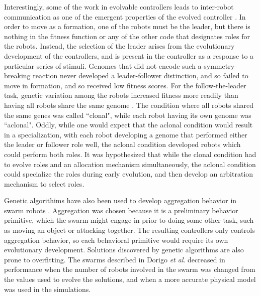 Interestingly, some of the work in evolvable controllers leads to inter-robot communication as one of the emergent properties of the evolved controller \citep{quinn2001evolving}.
In order to move as a formation, one of the robots must be the leader, but there is nothing in the fitness function or any of the other code that designates roles for the robots. 
Instead, the selection of the leader arises from the evolutionary development of the controllers, and is present in the controller as a response to a particular series of stimuli. 
Genomes that did not encode such a symmetry-breaking reaction never developed a leader-follower distinction, and so failed to move in formation, and so received low fitness scores. 
For the follow-the-leader task, genetic variation among the robots increased fitness more readily than having all robots share the same genome \citep{quinn2001comparison}.
The condition where all robots shared the same genes was called ``clonal", while each robot having its own genome was ``aclonal".
Oddly, while one would expect that the aclonal condition would result in a specialization, with each robot developing a genome that performed either the leader or follower role well, the aclonal condition developed robots which could perform both roles. 
It was hypothesized that while the clonal condition had to evolve roles and an allocation mechanism simultaneously, the aclonal condition could specialize the roles during early evolution, and then develop an arbitration mechanism to select roles.

Genetic algorithims have also been used to develop aggregation behavior in swarm robots \citep{bahgecci2005evolving, dorigo2004evolving}.  
Aggregation was chosen because it is a preliminary behavior primitive, which the swarm might engage in prior to doing some other task, such as moving an object or attacking together.
The resulting controllers only controls aggregation behavior, so each behavioral primitive would require its own evolutionary development. 
Solutions discovered by genetic algorithms are also prone to overfitting. 
The swarms described in Dorigo \emph{et al}. decreased in performance when the number of robots involved in the swarm was changed from the values used to evolve the solutions, and when a more accurate physical model was used in the simulations.

